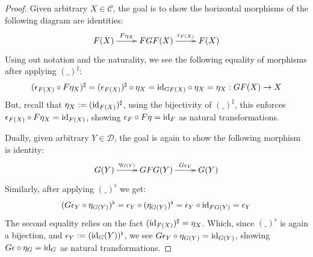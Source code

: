 \documentclass{article}
\begin{document}
\begin{proof}
    Given arbitrary $X\in\mathcal{C}$, the goal is to show the horizontal morphisms of the following diagram are identities:
    \[\xymatrix{
        F(X) \ar[r]^-{F\eta_X} & FGF(X) \ar[r]^-{\epsilon_{F(X)}} & F(X)
    }\]
    Using out notation and the naturality, we see the following equality of morphisms after applying $(\_)^\sharp$:
    \[(\epsilon_{F(X)}\circ F\eta_X)^\sharp = (\epsilon_{F(X)})^\sharp \circ \eta_X = \mathrm{id}_{GF(X)}\circ \eta_X = \eta_X:GF(X)\rightarrow X\]
    But, recall that $\eta_X:= (\mathrm{id}_{F(X)})^\sharp$, using the bijectivity of $(\_)^\sharp$, this enforces $\epsilon_{F(X)}\circ F\eta_X = \mathrm{id}_{F(X)}$, showing $\epsilon_F\circ F\eta=\mathrm{id}_F$ as natural transformations.

    \hfil

    Dually, given arbitrary $Y\in \mathcal{D}$, the goal is again to show the following morphism is identity:
    \[\xymatrix{
        G(Y) \ar[r]^-{\eta_{G(Y)}} & GFG(Y) \ar[r]^-{G\epsilon_{Y}} & G(Y)
    }\]
    Similarly, after applying $(\_)^\flat$ we get:
    \[(G\epsilon_Y\circ \eta_{G(Y)})^\flat = \epsilon_Y\circ (\eta_{G(Y)})^\flat = \epsilon_Y\circ \mathrm{id}_{FG(Y)}= \epsilon_Y\]
    The second equality relies on the fact $(\mathrm{id}_{F(X)})^\sharp = \eta_X$. Which, since $(\_)^\flat$ is again a bijection, and $\epsilon_Y := (\mathrm{id}_G(Y))^\flat$, we see $G\epsilon_Y\circ \eta_{G(Y)}=\mathrm{id}_{G(Y)}$, showing $G\epsilon\circ \eta_{G} = \mathrm{id}_G$ as natural transformations.
\end{proof}
\end{document}
